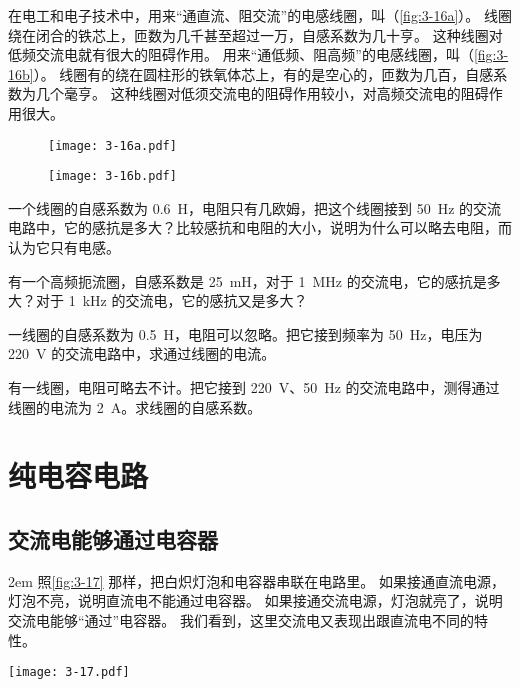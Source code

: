 在电工和电子技术中，用来“通直流、阻交流”的电感线圈，叫（\cref{fig:3-16a}）。
线圈绕在闭合的铁芯上，匝数为几千甚至超过一万，自感系数为几十亨。
这种线圈对低频交流电就有很大的阻碍作用。
用来“通低频、阻高频”的电感线圈，叫（\cref{fig:3-16b}）。
线圈有的绕在圆柱形的铁氧体芯上，有的是空心的，匝数为几百，自感系数为几个毫亨。
这种线圈对低须交流电的阻碍作用较小，对高频交流电的阻碍作用很大。
\begin{figure}
  \begin{minipage}[b]{0.45\linewidth}\centering
    \texttt{[image: 3-16a.pdf]}
    \label{fig:3-16a}
  \end{minipage}
  \begin{minipage}[b]{0.45\linewidth}\centering
    \texttt{[image: 3-16b.pdf]}
    \label{fig:3-16b}
  \end{minipage}
  \caption{}\label{fig:3-16}
\end{figure}

\begin{Practice}
\begin{question}
    \item 一个线圈的自感系数为 \qty{0.6}{H}，电阻只有几欧姆，把这个线圈接到 \qty{50}{Hz} 的交流电路中，它的感抗是多大？比较感抗和电阻的大小，说明为什么可以略去电阻，而认为它只有电感。
    \item 有一个高频扼流圈，自感系数是 \qty{25}{mH}，对于 \qty{1}{MHz} 的交流电，它的感抗是多大？对于 \qty{1}{kHz} 的交流电，它的感抗又是多大？
    \item 一线圈的自感系数为 \qty{0.5}{H}，电阻可以忽略。把它接到频率为 \qty{50}{Hz}，电压为 \qty{220}{V} 的交流电路中，求通过线圈的电流。
    \item 有一线圈，电阻可略去不计。把它接到 \qty{220}{V}、\qty{50}{Hz} 的交流电路中，测得通过线圈的电流为 \qty{2}{A}。求线圈的自感系数。
\end{question}
\end{Practice}
	
\section{纯电容电路}
\subsection{交流电能够通过电容器}
\medskip\noindent
\begin{minipage}{0.55\linewidth}\parindent2em
照\cref{fig:3-17} 那样，把白炽灯泡和电容器串联在电路里。
如果接通直流电源，灯泡不亮，说明直流电不能通过电容器。
如果接通交流电源，灯泡就亮了，说明交流电能够“通过”电容器。
我们看到，这里交流电又表现出跟直流电不同的特性。
\end{minipage}\hfill
\begin{minipage}{0.4\linewidth}
\begin{figurehere}
  \texttt{[image: 3-17.pdf]}
  \caption{}\label{fig:3-17}
\end{figurehere}
\end{minipage}

